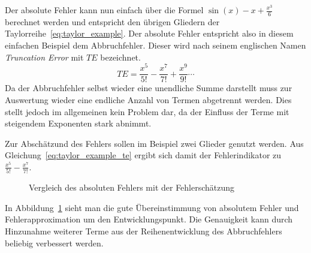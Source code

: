 Der absolute Fehler kann nun einfach über die Formel $\sin(x) - x + \frac{x^3}{6}$
berechnet werden und entspricht den übrigen Gliedern der Taylorreihe~\eqref{eq:taylor_example}.
Der absolute Fehler entspricht also in diesem einfachen Beispiel dem Abbruchfehler.
Dieser wird nach seinem englischen Namen \textit{Truncation Error} mit $TE$ bezeichnet.
\begin{equation}
  TE = \frac{x^5}{5!} -\frac{x^7}{7!} +\frac{x^9}{9!}\cdots
 \label{eq:taylor_example_te}
\end{equation}
Da der Abbruchfehler selbst wieder eine unendliche Summe darstellt muss zur Auswertung
wieder eine endliche Anzahl von Termen abgetrennt werden. Dies stellt jedoch im allgemeinen
kein Problem dar, da der Einfluss der Terme mit steigendem Exponenten stark abnimmt.

Zur Abschätzund des Fehlers sollen im Beispiel zwei Glieder genutzt werden. Aus
Gleichung~\eqref{eq:taylor_example_te} ergibt sich damit der Fehlerindikator zu
$\frac{x^5}{5!} -\frac{x^7}{7!} $.
\begin{figure}[h]
\centering
\caption{Vergleich des absoluten Fehlers mit der Fehlerschätzung}
 \label{fig:taylor_example_te}
\end{figure}
In Abbildung~\ref{fig:taylor_example_te} sieht man die gute Übereinstimmung von absolutem Fehler und Fehlerapproximation um den Entwicklungspunkt. Die Genauigkeit kann durch Hinzunahme weiterer Terme aus der Reihenentwicklung des Abbruchfehlers beliebig verbessert werden.
